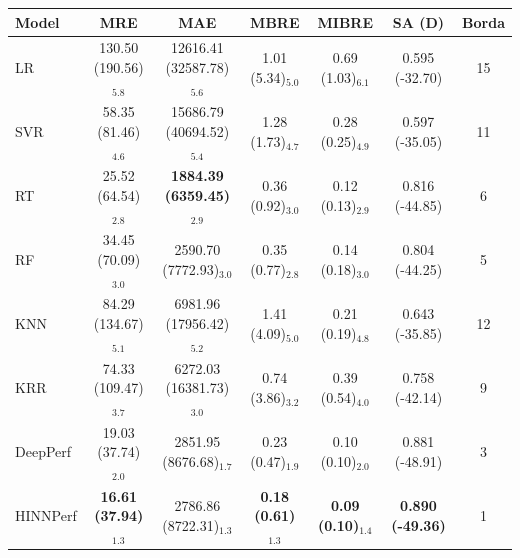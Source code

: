 \begin{tabular}{lcccccc}
\toprule
Model & MRE & MAE & MBRE & MIBRE & SA (D) & Borda \\
\midrule
LR & 130.50 (190.56)$_{5.8}$ & 12616.41 (32587.78)$_{5.6}$ & 1.01 (5.34)$_{5.0}$ & 0.69 (1.03)$_{6.1}$ & 0.595 (-32.70) & 15 \\
SVR & 58.35 (81.46)$_{4.6}$ & 15686.79 (40694.52)$_{5.4}$ & 1.28 (1.73)$_{4.7}$ & 0.28 (0.25)$_{4.9}$ & 0.597 (-35.05) & 11 \\
RT & 25.52 (64.54)$_{2.8}$ & \textbf{1884.39 (6359.45)$_{2.9}$} & 0.36 (0.92)$_{3.0}$ & 0.12 (0.13)$_{2.9}$ & 0.816 (-44.85) & 6 \\
RF & 34.45 (70.09)$_{3.0}$ & 2590.70 (7772.93)$_{3.0}$ & 0.35 (0.77)$_{2.8}$ & 0.14 (0.18)$_{3.0}$ & 0.804 (-44.25) & 5 \\
KNN & 84.29 (134.67)$_{5.1}$ & 6981.96 (17956.42)$_{5.2}$ & 1.41 (4.09)$_{5.0}$ & 0.21 (0.19)$_{4.8}$ & 0.643 (-35.85) & 12 \\
KRR & 74.33 (109.47)$_{3.7}$ & 6272.03 (16381.73)$_{3.0}$ & 0.74 (3.86)$_{3.2}$ & 0.39 (0.54)$_{4.0}$ & 0.758 (-42.14) & 9 \\
DeepPerf & 19.03 (37.74)$_{2.0}$ & 2851.95 (8676.68)$_{1.7}$ & 0.23 (0.47)$_{1.9}$ & 0.10 (0.10)$_{2.0}$ & 0.881 (-48.91) & 3 \\
HINNPerf & \textbf{16.61 (37.94)$_{1.3}$} & 2786.86 (8722.31)$_{1.3}$ & \textbf{0.18 (0.61)$_{1.3}$} & \textbf{0.09 (0.10)$_{1.4}$} & \textbf{0.890 (-49.36)} & 1 \\
\bottomrule
\end{tabular}
